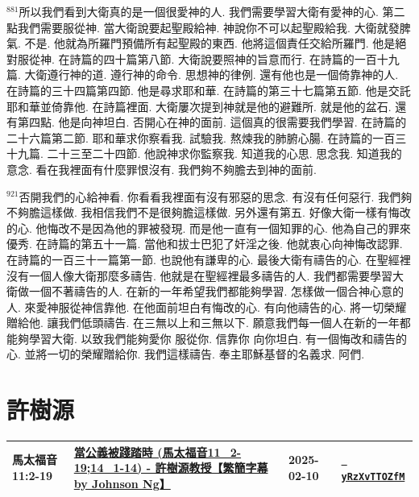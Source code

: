 \documentclass{book}
\begin{document}
$^{881}$所以我們看到大衛真的是一個很愛神的人.
我們需要學習大衛有愛神的心.
第二點我們需要服從神.
當大衛說要起聖殿給神.
神說你不可以起聖殿給我.
大衛就發脾氣.
不是.
他就為所羅門預備所有起聖殿的東西.
他將這個責任交給所羅門.
他是絕對服從神.
在詩篇的四十篇第八節.
大衛說要照神的旨意而行.
在詩篇的一百十九篇.
大衛遵行神的道.
遵行神的命令.
思想神的律例.
還有他也是一個倚靠神的人.
在詩篇的三十四篇第四節.
他是尋求耶和華.
在詩篇的第三十七篇第五節.
他是交託耶和華並倚靠他.
在詩篇裡面.
大衛屢次提到神就是他的避難所.
就是他的盆石.
還有第四點.
他是向神坦白.
否開心在神的面前.
這個真的很需要我們學習.
在詩篇的二十六篇第二節.
耶和華求你察看我.
試驗我.
熬煉我的肺腑心腸.
在詩篇的一百三十九篇.
二十三至二十四節.
他說神求你監察我.
知道我的心思.
思念我.
知道我的意念.
看在我裡面有什麼罪恨沒有.
我們夠不夠膽去到神的面前.

$^{921}$否開我們的心給神看.
你看看我裡面有沒有邪惡的思念.
有沒有任何惡行.
我們夠不夠膽這樣做.
我相信我們不是很夠膽這樣做.
另外還有第五.
好像大衛一樣有悔改的心.
他悔改不是因為他的罪被發現.
而是他一直有一個知罪的心.
他為自己的罪來優秀.
在詩篇的第五十一篇.
當他和拔士巴犯了奸淫之後.
他就衷心向神悔改認罪.
在詩篇的一百三十一篇第一節.
也說他有謙卑的心.
最後大衛有禱告的心.
在聖經裡沒有一個人像大衛那麼多禱告.
他就是在聖經裡最多禱告的人.
我們都需要學習大衛做一個不著禱告的人.
在新的一年希望我們都能夠學習.
怎樣做一個合神心意的人.
來愛神服從神信靠他.
在他面前坦白有悔改的心.
有向他禱告的心.
將一切榮耀贈給他.
讓我們低頭禱告.
在三無以上和三無以下.
願意我們每一個人在新的一年都能夠學習大衛.
以致我們能夠愛你 服從你.
信靠你 向你坦白.
有一個悔改和禱告的心.
並將一切的榮耀贈給你.
我們這樣禱告.
奉主耶穌基督的名義求.
阿們.
\newpage



\chapter{許樹源}\label{ch:preacher11}
\begin{multicols}{3}
\minitoc
\end{multicols}
{ \scriptsize


\begin{xltabular}{\textwidth}{|p{0.15\textwidth} p{0.6\textwidth}|p{0.07\textwidth} p{0.1\textwidth}|}
\hline
馬太福音 11:2-19 & \hyperref[sec:yRzXvTTOZfM]{當公義被踐踏時  (馬太福音11\_2-19;14\_1-14) - 許樹源教授【繁簡字幕 by Johnson Ng】} & 2025-02-10 & \href{https://youtube.com/watch?v=yRzXvTTOZfM}{\texttt{ yRzXvTTOZfM}} \\
\hline
\end{xltabular}
}
\newpage
\end{document}
